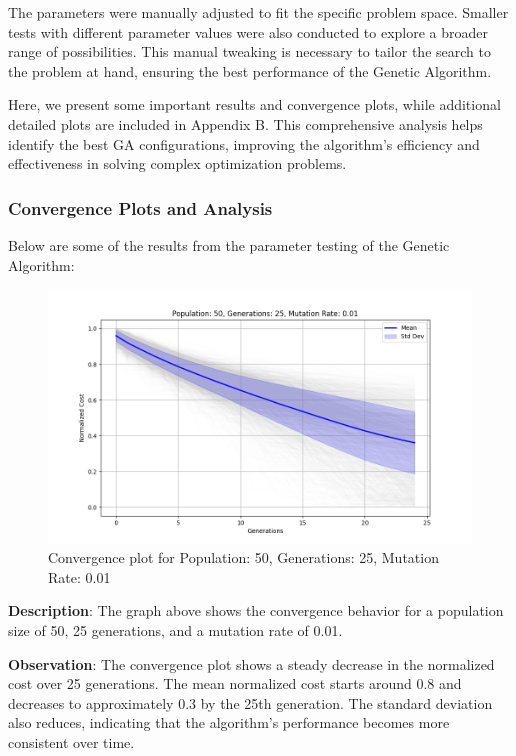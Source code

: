 \documentclass{article}
\begin{document}
    The parameters were manually adjusted to fit the specific problem space.
    Smaller tests with different parameter values were also conducted to explore a broader range of possibilities. This manual tweaking is necessary to tailor the search to the problem at hand, ensuring the best performance of the Genetic Algorithm.


    Here, we present some important results and convergence plots, while additional detailed plots are included in Appendix B. This comprehensive analysis helps identify the best GA configurations, improving the algorithm's efficiency and effectiveness in solving complex optimization problems.

    \subsubsection{Convergence Plots and Analysis}

    Below are some of the results from the parameter testing of the Genetic Algorithm:

    \begin{figure}[H]
        \centering
        \includegraphics[width=\textwidth]{genetic_algorithm/Population_50_Generations_25_MutationRate_0.01}
        \caption{Convergence plot for Population: 50, Generations: 25, Mutation Rate: 0.01}
        \label{fig:ga_50_25_01}
    \end{figure}

    \textbf{Description}: The graph above shows the convergence behavior for a population size of 50, 25 generations, and a mutation rate of 0.01.

    \textbf{Observation}: The convergence plot shows a steady decrease in the normalized cost over 25 generations. The mean normalized cost starts around 0.8 and decreases to approximately 0.3 by the 25th generation. The standard deviation also reduces, indicating that the algorithm's performance becomes more consistent over time.
\end{document}
